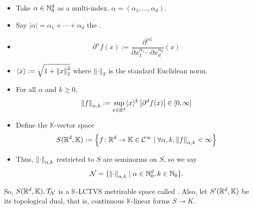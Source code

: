 \documentclass[11pt,leqno,oneside]{amsbook}
\numberwithin{thm}{section}
\newcommand{\Top}{\mathcal{T}} %
\newcommand{\cN}{\mathcal{N}}
\newcommand{\norms}{\cN}
\begin{document}
\begin{defn}
  \begin{itemize}
  \item Take \(\alpha \in \N_0^d\) as a multi-index. \(\alpha =
    (\alpha_1, \ldots, \alpha_d)\).
  \item Say \(|\alpha| = \alpha_1 + \cdots + \alpha_d\) the .
  \item \[
      \partial^\alpha f(x) := \frac{\partial^{|\alpha|}}{\partial
        x_1^{\alpha_1} \cdots \partial x_d^{\alpha_d}}(x)
    \]
  \item \(\langle x \rangle := \sqrt{1+\norm[x]_2^2}\) where
    \(\norm_2\) is the standard Euclidean norm.
  \item For all \(\alpha\) and \(k \geq 0\), \[
      \norm[f]_{\alpha,k} := \sup_{x \in \R^d} \langle x \rangle^k
      \left| \partial^d f(x) \right| \in [0,\infty]
    \]
  \item Define the \(\mathbb{K}\)-vector space \[
      S(\R^d,\mathbb{K}) := \left\{ f \from \R^d \to \mathbb{K} \in
        \mathcal{C}^\infty \st \forall \alpha, k, \norm[f]_{\alpha,k}
        < \infty \right\}
    \]
  \item Thus, \(\norm_{\alpha,k}\) restricted to \(S\) are seminorms
    on \(S\), so we say \[
      \norms = \{\norm_{\alpha,k} \st \alpha \in \N_0^d, k \in \N_0\}.
    \]
  \end{itemize}
  So, \(S(\R^d,\mathbb{K}), \Top_\norms\) is a \(\mathbb{K}\)-LCTVS
  metrizable space called . Also, let
  \(S'(\R^d,\mathbb{K})\) be its topological dual, that is, continuous
  \(\mathbb{K}\)-linear forms \(S \to K\).
\end{defn}
\end{document}
